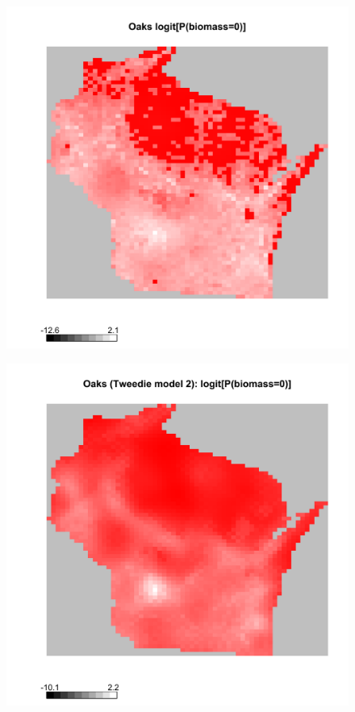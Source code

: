 \documentclass[authoryear, review, 11pt]{elsarticle}
\begin{document}
\begin{figure}
	\begin{center}
	\includegraphics[width=5in]{../../figures/Exploration/Oak-Tweedie-P0-biomass.pdf}
	\caption{\label{fig:oaks-biomass-residual}}
	\end{center}
\end{figure}

\begin{figure}
	\begin{center}
	\includegraphics[width=5in]{../../figures/Exploration/Oak-Tweedie2-P0-biomass.pdf}
	\caption{\label{fig:oaks-biomass-spline}}
	\end{center}
\end{figure}
\end{document}
